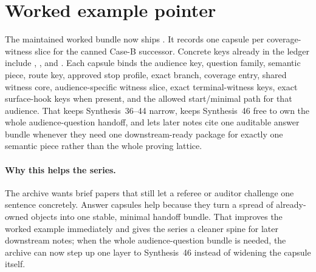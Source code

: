 \documentclass[11pt]{article}
\begin{document}
\section{Worked example pointer}
The maintained worked bundle now ships .\cite{series:workedexample}
It records one capsule per coverage-witness slice for the canned Case-B successor.
Concrete keys already in the ledger include , , and .
Each capsule binds the audience key, question family, semantic piece, route key, approved stop profile, exact branch, coverage entry, shared witness core, audience-specific witness slice, exact terminal-witness keys, exact surface-hook keys when present, and the allowed start/minimal path for that audience.
That keeps Synthesis~36--44 narrow, keeps Synthesis~46 free to own the whole audience-question handoff, and lets later notes cite one auditable answer bundle whenever they need one downstream-ready package for exactly one semantic piece rather than the whole proving lattice.\cite{series:challengeanswersheets}

\paragraph{Why this helps the series.}
The archive wants brief papers that still let a referee or auditor challenge one sentence concretely.
Answer capsules help because they turn a spread of already-owned objects into one stable, minimal handoff bundle.
That improves the worked example immediately and gives the series a cleaner spine for later downstream notes; when the whole audience-question bundle is needed, the archive can now step up one layer to Synthesis~46 instead of widening the capsule itself.\cite{series:challengeanswersheets}
\end{document}
